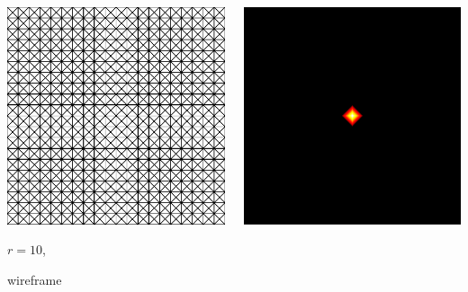 \documentclass[aspectratio=169,t]{beamer}
\begin{document}
{\begin{columns}
\begin{column}{0.22\textwidth}
			\includegraphics[width=.85\textwidth]{data/synthetic_meshes/square_tesselation_4tri_Dirac_delta_10_v841_f1600_wireframe_2.png}
			{\footnotesize 
				\par \vspace{-1mm} $r=10$, 
				\par \vspace{-1mm} wireframe
			}
		\end{column}
		\begin{column}{0.22\textwidth}
			\centering
			\includegraphics[width=.85\textwidth]{data/synthetic_meshes/square_tesselation_4tri_Dirac_delta_10_v841_f1600_funcvals_0iter.png}

\end{column}
\end{columns}}
\end{document}
